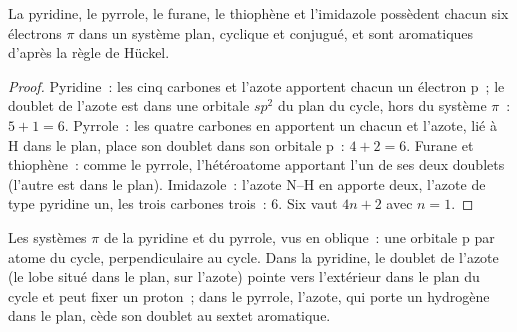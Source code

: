 \begin{proposition}\label{prop:b3:heterocycles:sextet}
La pyridine, le pyrrole, le furane, le thiophène et l'imidazole possèdent chacun six électrons $\pi$ dans
un système plan, cyclique et conjugué, et sont aromatiques d'après la règle
de Hückel.
\end{proposition}

\begin{proof}
Pyridine~: les cinq carbones et l'azote apportent chacun un électron p~; le
doublet de l'azote est dans une orbitale $sp^2$ du plan du cycle, hors du système $\pi$~: $5 + 1 = 6$.
Pyrrole~: les quatre carbones en apportent un chacun et l'azote, lié à H
dans le plan, place son doublet dans son orbitale p~: $4 + 2 = 6$. Furane et thiophène~: comme le
pyrrole, l'hétéroatome apportant l'un de ses deux doublets (l'autre est
dans le plan). Imidazole~: l'azote N--H en apporte deux, l'azote de type
pyridine un, les trois carbones trois~: 6. Six vaut $4n + 2$ avec $n = 1$.
\end{proof}

\begin{omfigure}

{\small Les systèmes $\pi$ de la pyridine et du pyrrole, vus en oblique~: une orbitale p par
atome du cycle, perpendiculaire au cycle. Dans la pyridine, le doublet de
l'azote (le lobe situé dans le plan, sur l'azote) pointe vers l'extérieur
dans le plan du cycle et peut fixer un proton~; dans le pyrrole, l'azote,
qui porte un hydrogène dans le plan, cède son doublet au sextet
aromatique.}
\end{omfigure}

